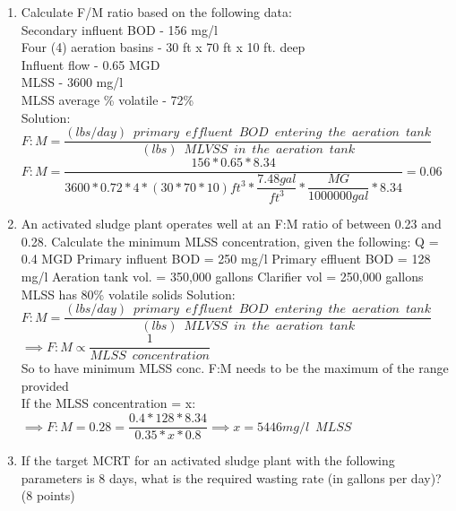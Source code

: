 \begin{enumerate}
\item Calculate F/M ratio based on the following data:\\
Secondary influent BOD - 156 mg/l\\
Four (4) aeration basins - 30 ft x 70 ft x 10 ft. deep\\
Influent flow - 0.65 MGD\\
MLSS - 3600 mg/l\\
MLSS average \% volatile - 72\%\\
Solution:\\
\vspace{0.3cm}
$F:M=\dfrac{(lbs/day) \enspace primary \enspace effluent  \enspace BOD \enspace entering \enspace the  \enspace aeration \enspace tank}{(lbs) \enspace MLVSS \enspace in \enspace the  \enspace aeration \enspace tank}$\\
\vspace{0.3cm}
$F:M=\dfrac{156*0.65*8.34}{3600*0.72*4*(30*70*10)ft^3* \dfrac{7.48gal}{ft^3}*\dfrac{MG}{1000000gal}*8.34}=\boxed{0.06}$\\
\vspace{0.3cm}
\item An activated sludge plant operates well at an F:M ratio of between 0.23 and 0.28.  Calculate the minimum MLSS concentration, given the following:
Q = 0.4 MGD
Primary influent BOD = 250 mg/l
Primary effluent BOD = 128 mg/l
Aeration tank vol. = 350,000 gallons
Clarifier vol = 250,000 gallons
MLSS has 80\% volatile solids
Solution:\\
\vspace{0.3cm}
$F:M=\dfrac{(lbs/day) \enspace primary \enspace effluent  \enspace BOD \enspace entering \enspace the  \enspace aeration \enspace tank}{(lbs) \enspace MLVSS \enspace in \enspace the  \enspace aeration \enspace tank}$\\
\vspace{0.3cm}
$\implies F:M \propto \dfrac{1}{MLSS \enspace concentration}$\\
\vspace{0.3cm}
So to have minimum MLSS conc. F:M needs to be the maximum of the range provided\\
\vspace{0.3cm}
If the MLSS concentration = x:
$ \implies F:M=0.28=\dfrac{0.4*128*8.34}{0.35*x*0.8}\implies x = \boxed{5446 mg/l \enspace MLSS}$







\item If the target MCRT for an activated sludge plant with the following parameters is 8 days, what is the required wasting rate (in gallons per day)? (8 points)


\end{enumerate}
